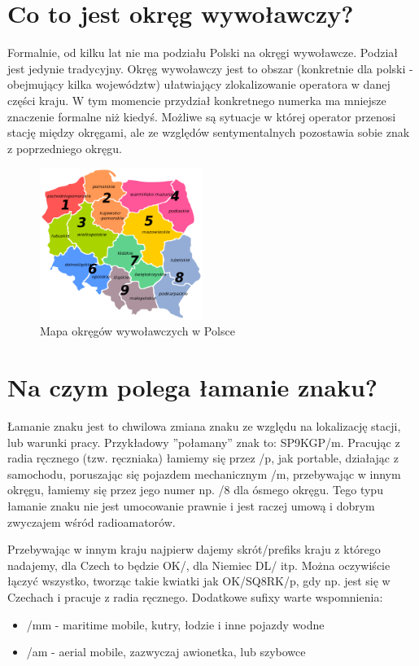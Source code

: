 \documentclass[a4paper,12pt]{article}
\begin{document}
\section{Co to jest okręg wywoławczy?}
Formalnie, od kilku lat nie ma podziału Polski na okręgi wywoławcze. Podział jest jedynie tradycyjny. Okręg wywoławczy jest to obszar (konkretnie dla polski - obejmujący kilka województw) ułatwiający zlokalizowanie operatora w danej części kraju. W tym momencie przydział konkretnego numerka ma mniejsze znaczenie formalne niż kiedyś. Możliwe są sytuacje w której operator przenosi stację między okręgami, ale ze względów sentymentalnych pozostawia sobie znak z poprzedniego okręgu. 
\begin{figure}[h]
 \centering
 \includegraphics[width=150pt]{./Polish_HAM_Radio_Regions.png}
 \caption{Mapa okręgów wywoławczych w Polsce}
\end{figure}

\section{Na czym polega łamanie znaku?}
Łamanie znaku jest to chwilowa zmiana znaku ze względu na lokalizację stacji, lub warunki pracy. Przykładowy ”połamany” znak to: SP9KGP/m. Pracując z radia ręcznego (tzw. ręczniaka) łamiemy się przez /p, jak portable, działając z samochodu, poruszając się pojazdem mechanicznym /m, przebywając w innym okręgu, łamiemy się przez jego numer np. /8 dla ósmego okręgu. Tego typu łamanie znaku nie jest umocowanie prawnie i jest raczej umową i dobrym zwyczajem wśród radioamatorów.

Przebywając w innym kraju najpierw dajemy skrót/prefiks kraju z którego nadajemy, dla Czech to będzie OK/, dla Niemiec DL/ itp. Można oczywiście łączyć wszystko, tworząc takie kwiatki jak OK/SQ8RK/p, gdy np. jest się w Czechach i pracuje z radia ręcznego.
Dodatkowe sufixy warte wspomnienia:
\begin{itemize}
\item /mm - maritime mobile, kutry, łodzie i inne pojazdy wodne
\item /am - aerial mobile, zazwyczaj awionetka, lub szybowce\end{itemize}
\end{document}
